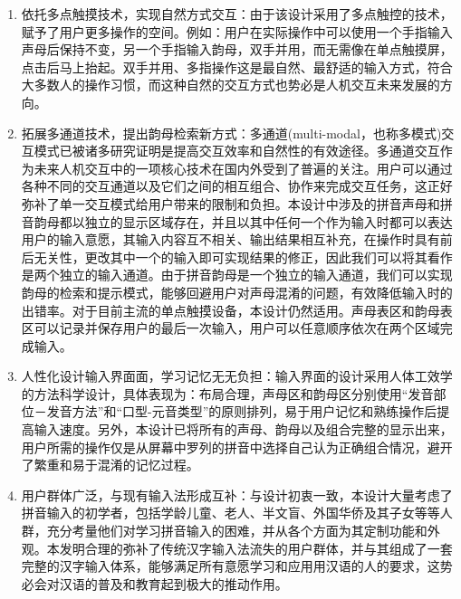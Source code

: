   \begin{enumerate}
  \item
  依托多点触摸技术，实现⾃然⽅式交互：由于该设计采用了多点触控的技术，赋予了用户更多操作的空间。例如：用户在实际操作中可以使用一个手指输入声母后保持不变，另一个手指输入韵母，双手并用，而无需像在单点触摸屏，点击后马上抬起。双⼿并用、多指操作这是最自然、最舒适的输⼊方式，符合⼤多数⼈的操作习惯，而这种自然的交互⽅式也势必是人机交互未来发展的⽅向。

  \item
  拓展多通道技术，提出韵母检索新⽅式：多通道(multi-modal，也称多模式)交互模式已被诸多研究证明是提高交互效率和自然性的有效途径。多通道交互作为未来人机交互中的一项核心技术在国内外受到了普遍的关注。\supercite{dsh,lmz}用户可以通过各种不同的交互通道以及它们之间的相互组合、协作来完成交互任务，这正好弥补了单一交互模式给用户带来的限制和负担。本设计中涉及的拼⾳声母和拼⾳韵母都以独立的显示区域存在，并且以其中任何一个作为输⼊时都可以表达⽤户的输⼊意愿，其输入内容互不相关、输出结果相互补充，在操作时具有前后⽆关性，更改其中一个的输⼊即可实现结果的修正，因此我们可以将其看作是两个独立的输⼊通道。由于拼⾳韵母是一个独⽴的输⼊通道，我们可以实现韵母的检索和提示模式，能够回避⽤户对声母混淆的问题，有效降低输入时的出错率。对于⽬前主流的单点触摸设备，本设计仍然适用。声母表区和韵母表区可以记录并保存⽤户的最后一次输入，用户可以任意顺序依次在两个区域完成输入。

  \item
  人性化设计输入界⾯面，学习记忆⽆无负担：输入界面的设计采用人体工效学的方法科学设计，具体表现为：布局合理，声母区和韵母区分别使用“发音部位－发音方法”和“口型-元音类型”的原则排列，易于用户记忆和熟练操作后提高输入速度。另外，本设计已将所有的声母、韵母以及组合完整的显示出来，用户所需的操作仅是从屏幕中罗列的拼⾳中选择⾃己认为正确组合情况，避开了繁重和易于混淆的记忆过程。

  \item
  ⽤户群体广泛，与现有输⼊法形成互补：与设计初衷一致，本设计大量考虑了拼音输入的初学者，包括学龄儿童、老人、半文盲、外国华侨及其子女等等人群，充分考量他们对学习拼音输入的困难，并从各个方面为其定制功能和外观。本发明合理的弥补了传统汉字输入法流失的⽤户群体，并与其组成了一套完整的汉字输⼊体系，能够满足所有意愿学习和应⽤用汉语的人的要求，这势必会对汉语的普及和教育起到极大的推动作用。
  \end{enumerate}
